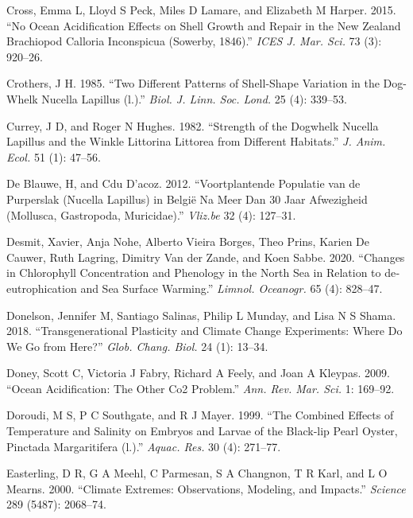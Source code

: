 \documentclass[smallextended]{svjour3}       %
\newlength{\cslhangindent}
\newenvironment{CSLReferences}[2] %
 {%
  \setlength{\parindent}{0pt}
  \ifodd #1 \everypar{\setlength{\hangindent}{\cslhangindent}}\ignorespaces\fi
  \ifnum #2 > 0
  \setlength{\parskip}{#2\baselineskip}
  \fi
 }%
 {}
\begin{document}
\begin{CSLReferences}{1}{0}
\leavevmode{}%
Cross, Emma L, Lloyd S Peck, Miles D Lamare, and Elizabeth M Harper.
2015. {``No Ocean Acidification Effects on Shell Growth and Repair in
the New Zealand Brachiopod Calloria Inconspicua (Sowerby, 1846).''}
\emph{ICES J. Mar. Sci.} 73 (3): 920--26.

\leavevmode{}%
Crothers, J H. 1985. {``Two Different Patterns of Shell-Shape Variation
in the Dog-Whelk Nucella Lapillus (l.).''} \emph{Biol. J. Linn. Soc.
Lond.} 25 (4): 339--53.

\leavevmode{}%
Currey, J D, and Roger N Hughes. 1982. {``Strength of the Dogwhelk
Nucella Lapillus and the Winkle Littorina Littorea from Different
Habitats.''} \emph{J. Anim. Ecol.} 51 (1): 47--56.

\leavevmode{}%
De Blauwe, H, and Cdu D'acoz. 2012. {``Voortplantende Populatie van de
Purperslak (Nucella Lapillus) in Belgi{ë} Na Meer Dan 30 Jaar
Afwezigheid (Mollusca, Gastropoda, Muricidae).''} \emph{Vliz.be} 32 (4):
127--31.

\leavevmode{}%
Desmit, Xavier, Anja Nohe, Alberto Vieira Borges, Theo Prins, Karien De
Cauwer, Ruth Lagring, Dimitry Van der Zande, and Koen Sabbe. 2020.
{``Changes in Chlorophyll Concentration and Phenology in the North Sea
in Relation to de‐eutrophication and Sea Surface Warming.''}
\emph{Limnol. Oceanogr.} 65 (4): 828--47.

\leavevmode{}%
Donelson, Jennifer M, Santiago Salinas, Philip L Munday, and Lisa N S
Shama. 2018. {``Transgenerational Plasticity and Climate Change
Experiments: Where Do We Go from Here?''} \emph{Glob. Chang. Biol.} 24
(1): 13--34.

\leavevmode{}%
Doney, Scott C, Victoria J Fabry, Richard A Feely, and Joan A Kleypas.
2009. {``Ocean Acidification: The Other {Co2} Problem.''} \emph{Ann.
Rev. Mar. Sci.} 1: 169--92.

\leavevmode{}%
Doroudi, M S, P C Southgate, and R J Mayer. 1999. {``The Combined
Effects of Temperature and Salinity on Embryos and Larvae of the
Black‐lip Pearl Oyster, Pinctada Margaritifera (l.).''} \emph{Aquac.
Res.} 30 (4): 271--77.

\leavevmode{}%
Easterling, D R, G A Meehl, C Parmesan, S A Changnon, T R Karl, and L O
Mearns. 2000. {``Climate Extremes: Observations, Modeling, and
Impacts.''} \emph{Science} 289 (5487): 2068--74.


\end{CSLReferences}
\end{document}

